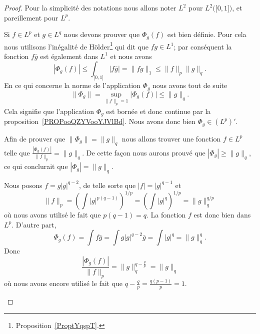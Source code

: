 \begin{proof}
	Pour la simplicité des notations nous allons noter \( L^2\) pour \( L^2\big( \mathopen[ 0 , 1 \mathclose] \big)\), et pareillement pour \( L^p\).
	\begin{subproof}

		Si \( f\in L^p\) et \( g\in L^q\) nous devons prouver que \( \Phi_g(f)\) est bien définie. Pour cela nous utilisons l'inégalité de Hölder\footnote{Proposition~\ref{ProptYqspT}.} qui dit que \( fg\in L^1\); par conséquent la fonction \( f\bar g\) est également dans \( L^1\) et nous avons
		\begin{equation}
			| \Phi_g(f) |\leq\int_{\mathopen[ 0 , 1 \mathclose]}| f\bar g |=\| fg \|_1\leq \| f \|_p\| g \|_q.
		\end{equation}
		En ce qui concerne la norme de l'application \( \Phi_g\) nous avons tout de suite
		\begin{equation}
			\| \Phi_g \|=\sup_{\| f\|_p=1}\big| \Phi_g(f) \big|\leq \| g \|_q.
		\end{equation}
		Cela signifie que l'application \( \Phi_g\) est bornée et donc continue par la proposition~\ref{PROPooQZYVooYJVlBd}. Nous avons donc bien \( \Phi_g\in (L^p)'\).

		\spitem[Isométrie]

		Afin de prouver que \( \| \Phi_g \|=\| g \|_q\) nous allons trouver une fonction \( f\in L^p\) telle que \( \frac{ | \Phi_g(f) | }{ \| f \|_p }=\| g \|_q\).  De cette façon nous aurons prouvé que \( | \Phi_g |\geq \| g \|_q\), ce qui conclurait que \( | \Phi_g |=\| g \|_q\).

		Nous posons \( f=g| g |^{q-2}\), de telle sorte que \( | f |=| g |^{q-1}\) et
		\begin{equation}
			\| f \|_p=\left( \int| g |^{p(q-1)} \right)^{1/p}=\left( \int | g |^q \right)^{1/p}=\| g \|_q^{q/p}
		\end{equation}
		où nous avons utilisé le fait que \( p(q-1)=q\). La fonction \( f\) est donc bien dans \( L^p\). D'autre part,
		\begin{equation}
			\Phi_g(f)=\int f\bar g=\int g| g |^{q-2}\bar g=\int | g |^q=\| g \|_q^q.
		\end{equation}
		Donc
		\begin{equation}
			\frac{ | \Phi_g(f) | }{ \| f \|_p }=\| g \|_q^{q-\frac{ q }{ p }}=\| g \|_q
		\end{equation}
		où nous avons encore utilisé le fait que \( q-\frac{ q }{ p }=\frac{ q(p-1) }{ p }=1\).


\end{subproof}
\end{proof}
